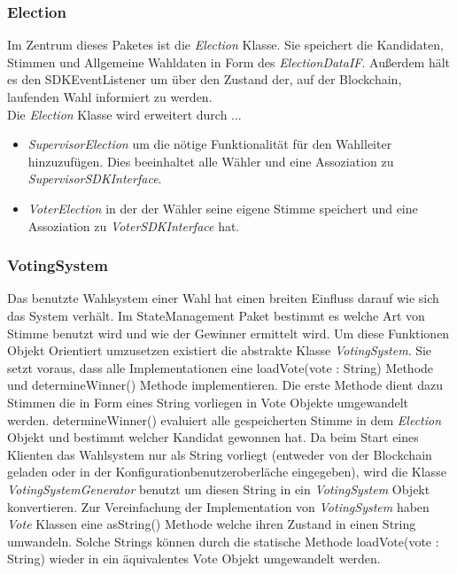 \documentclass[parskip=full]{scrartcl}
\begin{document}
	\subsubsection{Election}
	Im Zentrum dieses Paketes ist die \textit{Election} Klasse. Sie speichert die Kandidaten, Stimmen und Allgemeine Wahldaten in Form des \textit{ElectionDataIF}. Außerdem hält es den SDKEventListener um über den Zustand der, auf 
	der Blockchain, laufenden Wahl informiert zu werden.\\
	Die \textit{Election} Klasse wird erweitert durch ...
	\begin{itemize}
	\item\textit{SupervisorElection} um die nötige Funktionalität für den Wahlleiter hinzuzufügen. Dies beeinhaltet alle Wähler und eine Assoziation zu \textit{SupervisorSDKInterface}.
	\item\textit{VoterElection} in der der Wähler seine eigene Stimme speichert und eine Assoziation zu \textit{VoterSDKInterface} hat.
	\end{itemize}
	
	\subsubsection{VotingSystem}
	Das benutzte Wahlsystem einer Wahl hat einen breiten Einfluss darauf wie sich das System verhält. Im StateManagement Paket bestimmt es welche Art von Stimme benutzt wird und wie der Gewinner ermittelt wird.
	Um diese Funktionen Objekt Orientiert umzusetzen existiert die abstrakte Klasse \textit{VotingSystem}. Sie setzt voraus, dass alle Implementationen eine loadVote(vote : String) Methode und determineWinner() Methode implementieren. Die erste Methode dient dazu Stimmen die in Form eines String vorliegen in Vote Objekte umgewandelt werden. determineWinner() evaluiert alle gespeicherten Stimme in dem \textit{Election} Objekt und bestimmt welcher Kandidat gewonnen hat.
	Da beim Start eines Klienten das Wahlsystem nur als String vorliegt (entweder von der Blockchain geladen oder in der Konfigurationbenutzeroberläche eingegeben), wird die Klasse \textit{VotingSystemGenerator} benutzt um diesen String in ein \textit{VotingSystem} Objekt konvertieren.
	Zur Vereinfachung der Implementation von \textit{VotingSystem} haben \textit{Vote} Klassen eine asString() Methode welche ihren Zustand in einen String umwandeln. Solche Strings können durch die statische Methode loadVote(vote : String) wieder in ein äquivalentes Vote Objekt umgewandelt werden.
	
\end{document}
